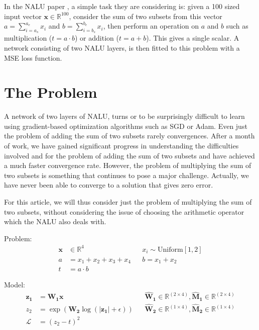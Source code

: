 \documentclass[a4paper]{article}
\begin{document}
In the NALU paper \cite{nalu}, a simple task they are considering is: given a 100 sized input vector $\mathbf{x} \in \mathbb{R}^{100}$, consider the sum of two subsets from this vector $a = \sum_{i=a_s}^{a_e} x_i$ and $b = \sum_{i=b_s}^{b_e} x_i$, then perform an operation on $a$ and $b$ such as multiplication ($t = a \cdot b$) or addition ($t = a + b$). This gives a single scalar. A network consisting of two NALU layers, is then fitted to this problem with a MSE loss function.

\section{The Problem}

A network of two layers of NALU, turns or to be surprisingly difficult to learn using gradient-based optimization algorithms such as SGD or Adam. Even just the problem of adding the sum of two subsets rarely convergences. After a month of work, we have gained significant progress in understanding the difficulties involved and for the problem of adding the sum of two subsets and have achieved a much faster convergence rate. However, the problem of multiplying the sum of two subsets is something that continues to pose a major challenge. Actually, we have never been able to converge to a solution that gives zero error.

For this article, we will thus consider just the problem of multiplying the sum of two subsets, without considering the issue of choosing the arithmetic operator which the NALU also deals with.


Problem:
\begin{equation}
\begin{aligned}
\mathbf{x} &\in \mathbb{R}^4 && x_i \sim \mathrm{Uniform}[1, 2] \\
a &= x_1 + x_2 + x_3 + x_4 && b = x_1 + x_2 \\
t &= a \cdot b
\end{aligned}
\end{equation}

Model:
\begin{equation}
\begin{aligned}
\mathbf{z_1} &= \mathbf{W_1} \mathbf{x} &&\mathbf{\hat{W}_1} \in \mathbb{R}^{(2 \times 4)}, \mathbf{\hat{M}_1} \in \mathbb{R}^{(2 \times 4)} \\
z_2 &= \exp(\mathbf{W_2} \log(|\mathbf{z_1}| + \epsilon)) &&\mathbf{\hat{W}_2} \in \mathbb{R}^{(1 \times 4)}, \mathbf{\hat{M}_2} \in \mathbb{R}^{(1 \times 4)} \\
\mathcal{L} &= (z_2 - t)^2
\end{aligned}
\end{equation}
\end{document}
